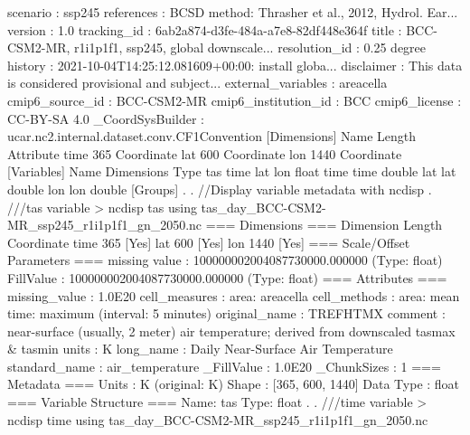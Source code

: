 scenario                 : ssp245
references               : BCSD method: Thrasher et al., 2012, Hydrol. Ear...
version                  : 1.0
tracking_id              : 6ab2a874-d3fe-484a-a7e8-82df448e364f
title                    : BCC-CSM2-MR, r1i1p1f1, ssp245, global downscale...
resolution_id            : 0.25 degree
history                  : 2021-10-04T14:25:12.081609+00:00: install globa...
disclaimer               : This data is considered provisional and subject...
external_variables       : areacella
cmip6_source_id          : BCC-CSM2-MR
cmip6_institution_id     : BCC
cmip6_license            : CC-BY-SA 4.0
_CoordSysBuilder         : ucar.nc2.internal.dataset.conv.CF1Convention
{\smallskip}
[Dimensions]
Name                 Length   Attribute      
time                 365      Coordinate     
lat                  600      Coordinate     
lon                  1440     Coordinate     
{\smallskip}
[Variables]
Name                      Dimensions                     Type           
tas                       time lat lon                   float          
time                      time                           double         
lat                       lat                            double         
lon                       lon                            double         
{\smallskip}
[Groups]
{\smallskip}
. 
. //Display variable metadata with ncdisp
. ///tas variable
> ncdisp tas using tas_day_BCC-CSM2-MR_ssp245_r1i1p1f1_gn_2050.nc
{\smallskip}
=== Dimensions ===
Dimension       Length   Coordinate     
time            365      [Yes]          
lat             600      [Yes]          
lon             1440     [Yes]          
{\smallskip}
=== Scale/Offset Parameters ===
missing value  : 100000002004087730000.000000 (Type: float)
 FillValue     : 100000002004087730000.000000 (Type: float)
{\smallskip}
=== Attributes ===
missing_value       : 1.0E20
cell_measures       : area: areacella
cell_methods        : area: mean time: maximum (interval: 5 minutes)
original_name       : TREFHTMX
comment             : near-surface (usually, 2 meter) air temperature; derived from downscaled tasmax \& tasmin
units               : K
long_name           : Daily Near-Surface Air Temperature
standard_name       : air_temperature
_FillValue          : 1.0E20
_ChunkSizes         : 1
{\smallskip}
=== Metadata ===
Units          : K (original: K)
{\smallskip}
Shape          : [365, 600, 1440]
Data Type      : float
{\smallskip}
=== Variable Structure ===
Name: tas                       Type: float          
{\smallskip}
. 
. ///time variable
> ncdisp time using tas_day_BCC-CSM2-MR_ssp245_r1i1p1f1_gn_2050.nc
